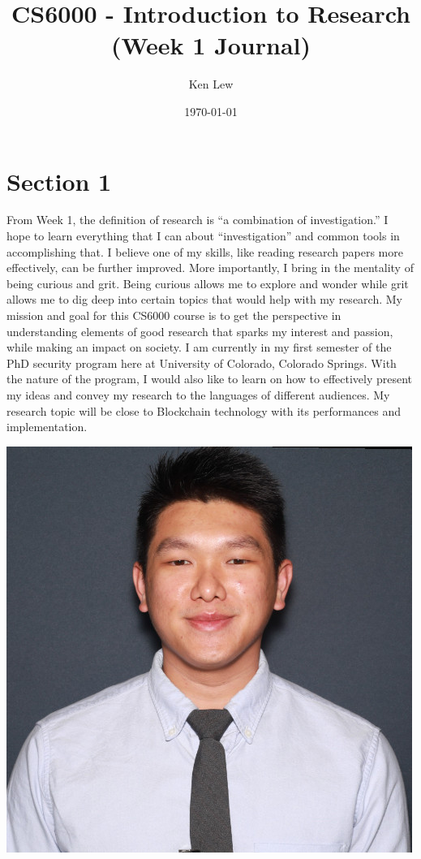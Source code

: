\documentclass[11pt]{article}
\title{CS6000 - Introduction to Research (Week 1 Journal)}
\author{ Ken Lew }
\date{\today}
\begin{document}
\maketitle

\section{Section 1}

From Week 1, the definition of research is “a combination of investigation.” I hope to learn everything that I can about “investigation” and common tools in accomplishing that. I believe one of my skills, like reading research papers more effectively, can be further improved. More importantly, I bring in the mentality of being curious and grit. Being curious allows me to explore and wonder while grit allows me to dig deep into certain topics that would help with my research. My mission and goal for this CS6000 course is to get the perspective in understanding elements of good research that sparks my interest and passion, while making an impact on society. I am currently in my first semester of the PhD security program here at University of Colorado, Colorado Springs. With the nature of the program, I would also like to learn on how to effectively present my ideas and convey my research to the languages of different audiences. My research topic will be close to Blockchain technology with its performances and implementation. 

\begin{center}
\includegraphics[scale=0.45]{kl.png}
\end{center}
\end{document}
